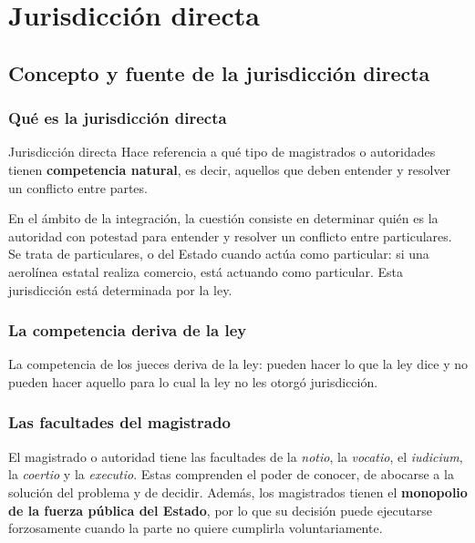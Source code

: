 \documentclass[12pt,oneside]{book}
\begin{document}
\chapter[Jurisdicción directa]{Jurisdicción directa}

\section{Concepto y fuente de la jurisdicción directa}

\subsection{Qué es la jurisdicción directa}

\begin{definition}{Jurisdicción directa}
Hace referencia a qué tipo de magistrados o autoridades tienen \textbf{competencia natural}, es decir, aquellos que deben entender y resolver un conflicto entre partes.
\end{definition}

En el ámbito de la integración, la cuestión consiste en determinar quién es la autoridad con potestad para entender y resolver un conflicto entre particulares. Se trata de particulares, o del Estado cuando actúa como particular: si una aerolínea estatal realiza comercio, está actuando como particular. Esta jurisdicción está determinada por la ley.

\subsection{La competencia deriva de la ley}

La competencia de los jueces deriva de la ley: pueden hacer lo que la ley dice y no pueden hacer aquello para lo cual la ley no les otorgó jurisdicción.

\subsection{Las facultades del magistrado}

El magistrado o autoridad tiene las facultades de la \textit{notio}, la \textit{vocatio}, el \textit{iudicium}, la \textit{coertio} y la \textit{executio}. Estas comprenden el poder de conocer, de abocarse a la solución del problema y de decidir. Además, los magistrados tienen el \textbf{monopolio de la fuerza pública del Estado}, por lo que su decisión puede ejecutarse forzosamente cuando la parte no quiere cumplirla voluntariamente.
\end{document}
